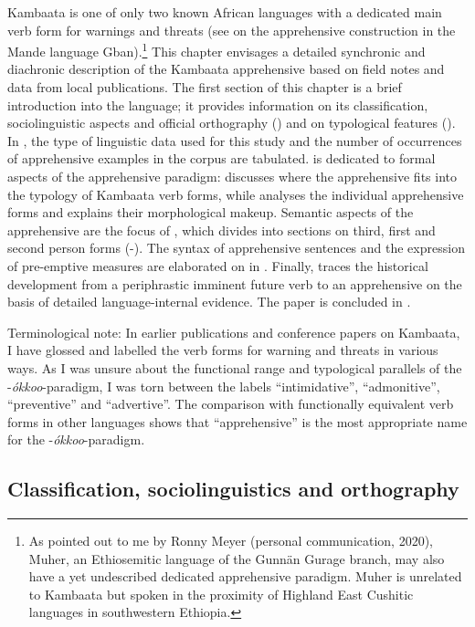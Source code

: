 \documentclass[output=paper,colorlinks,citecolor=brown,
]{langsci/langscibook}
\begin{document}
Kambaata is one of only two known African languages with a dedicated main verb form for warnings and threats (see \citealt{chapters/fedotov} on the apprehensive construction in the Mande language Gban).\footnote{As pointed out to me by Ronny Meyer (personal communication, 2020), Muher, an Ethiosemitic language of the Gunnän Gurage branch, may also have a yet undescribed dedicated apprehensive paradigm. Muher is unrelated to Kambaata but spoken in the proximity of Highland East Cushitic languages in southwestern Ethiopia.} This chapter envisages a detailed synchronic and diachronic description of the Kambaata apprehensive based on field notes and data from local publications. The first section of this chapter is a brief introduction into the language; it provides information on its classification, sociolinguistic aspects and official orthography () and on typological features (). In , the type of linguistic data used for this study and the number of occurrences of apprehensive examples in the corpus are tabulated.  is dedicated to formal aspects of the apprehensive paradigm:  discusses where the apprehensive fits into the typology of Kambaata verb forms, while  analyses the individual apprehensive forms and explains their morphological makeup. Semantic aspects of the apprehensive are the focus of , which divides into sections on third, first and second person forms (-). The syntax of apprehensive sentences and the expression of pre-emptive measures are elaborated on in . Finally,  traces the historical development from a periphrastic imminent future verb to an apprehensive on the basis of detailed language-internal evidence. The paper is concluded in .

Terminological note: In earlier publications and conference papers on Kambaata, I have glossed and labelled the verb forms for warning and threats in various ways. As I was unsure about the functional range and typological parallels of the \nobreakdash-\textit{ókkoo}-paradigm, I was torn between the labels ``intimidative'', ``admonitive'', ``preventive'' and ``advertive''. The comparison with functionally equivalent verb forms in other languages shows that ``apprehensive'' is the most appropriate name for the \nobreakdash-\textit{ókkoo}-paradigm.

\subsection{Classification, sociolinguistics and orthography}\label{sec:treis:1.1}
\end{document}
